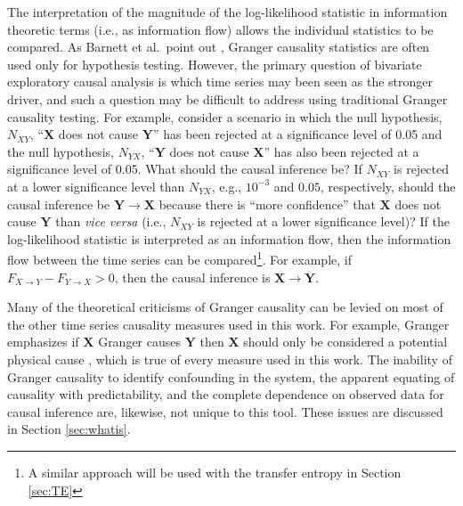 The interpretation of the magnitude of the log-likelihood statistic in information theoretic terms (i.e., as information flow) allows the individual statistics to be compared.  As Barnett et al.\ point out \cite{Barnett2014}, Granger causality statistics are often used only for hypothesis testing.  However, the primary question of bivariate exploratory causal analysis is which time series may been seen as the stronger driver, and such a question may be difficult to address using traditional Granger causality testing.  For example, consider a scenario in which the null hypothesis, $N_{XY}$, ``$\mathbf{X}$ does not cause $\mathbf{Y}$'' has been rejected at a significance level of 0.05 and the null hypothesis, $N_{YX}$, ``$\mathbf{Y}$ does not cause $\mathbf{X}$'' has also been rejected at a significance level of 0.05.  What should the causal inference be?  If $N_{XY}$ is rejected at a lower significance level than $N_{YX}$, e.g., $10^{-3}$ and $0.05$, respectively, should the causal inference be $\mathbf{Y}\rightarrow\mathbf{X}$ because there is ``more confidence'' that $\mathbf{X}$ does not cause $\mathbf{Y}$ than {\em vice versa} (i.e., $N_{XY}$ is rejected at a lower significance level)?  If the log-likelihood statistic is interpreted as an information flow, then the information flow between the time series can be compared\footnote{A similar approach will be used with the transfer entropy in Section \ref{sec:TE}}.  For example, if $F_{X\rightarrow Y}-F_{Y\rightarrow X}>0$, then the causal inference is $\mathbf{X}\rightarrow\mathbf{Y}$.

Many of the theoretical criticisms of Granger causality can be levied on most of the other time series causality measures used in this work.  For example, Granger emphasizes if $\mathbf{X}$ Granger causes $\mathbf{Y}$ then $\mathbf{X}$ should only be considered a potential physical cause \cite{Granger1963,Berzuini2012}, which is true of every measure used in this work.   The inability of Granger causality to identify confounding in the system, the apparent equating of causality with predictability, and the complete dependence on observed data for causal inference are, likewise, not unique to this tool.  These issues are discussed in Section \ref{sec:whatis}.  

